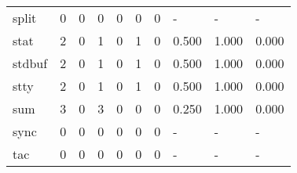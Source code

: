 \begin{longtable}{lp{1.3cm}p{1.3cm}p{1.3cm}p{1.3cm}p{1.3cm}p{1.3cm}p{1.3cm}p{1.3cm}p{1.3cm}}
split     &                      0 &                                  0 &                                 0 &                                0 &                                 0 &                               0 &                                    - &                                      - &                                    - \\
stat      &                      2 &                                  0 &                                 1 &                                0 &                                 1 &                               0 &                                0.500 &                                  1.000 &                                0.000 \\
stdbuf    &                      2 &                                  0 &                                 1 &                                0 &                                 1 &                               0 &                                0.500 &                                  1.000 &                                0.000 \\
stty      &                      2 &                                  0 &                                 1 &                                0 &                                 1 &                               0 &                                0.500 &                                  1.000 &                                0.000 \\
sum       &                      3 &                                  0 &                                 3 &                                0 &                                 0 &                               0 &                                0.250 &                                  1.000 &                                0.000 \\
sync      &                      0 &                                  0 &                                 0 &                                0 &                                 0 &                               0 &                                    - &                                      - &                                    - \\
tac       &                      0 &                                  0 &                                 0 &                                0 &                                 0 &                               0 &                                    - &                                      - &                                    - \\

\end{longtable}
